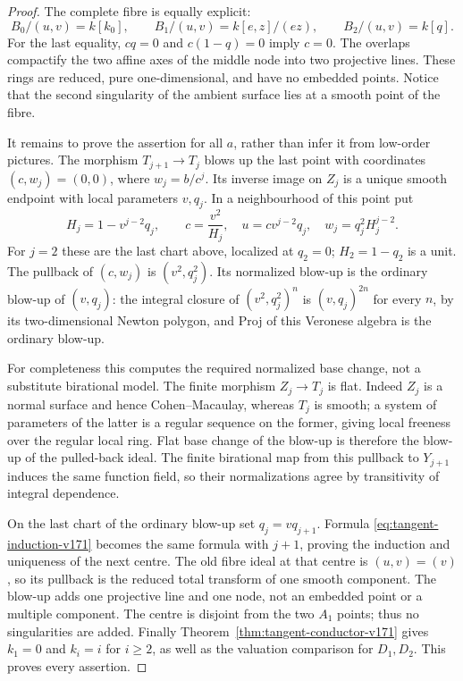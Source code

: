 \begin{proof}
The complete fibre is equally explicit:
\begin{equation}\label{eq:square-full-fibre-v171}
 B_0/(u,v)=k[k_0],\qquad
 B_1/(u,v)=k[e,z]/(ez),\qquad
 B_2/(u,v)=k[q].
\end{equation}
For the last equality, $cq=0$ and $c(1-q)=0$ imply $c=0$.
The overlaps compactify the two affine axes of the middle node into
two projective lines. These rings are reduced, pure one-dimensional,
and have no embedded points. Notice that the second singularity of
the ambient surface lies at a smooth point of the fibre.

It remains to prove the assertion for all $a$, rather than infer it
from low-order pictures. The morphism $T_{j+1}\to T_j$ blows up the
last point with coordinates $(c,w_j)=(0,0)$, where $w_j=b/c^j$.
Its inverse image on $Z_j$ is a unique smooth endpoint with local
parameters $v,q_j$. In a neighbourhood of this point put
\begin{equation}\label{eq:tangent-induction-v171}
 H_j=1-v^{j-2}q_j,\qquad
 c=\frac{v^2}{H_j},\quad
 u=c v^{j-2}q_j,\quad
 w_j=q_j^2H_j^{j-2}.
\end{equation}
For $j=2$ these are the last chart above, localized at $q_2=0$;
$H_2=1-q_2$ is a unit. The pullback of $(c,w_j)$ is
$(v^2,q_j^2)$. Its normalized blow-up is the ordinary blow-up of
$(v,q_j)$: the integral closure of $(v^2,q_j^2)^n$ is
$(v,q_j)^{2n}$ for every $n$, by its two-dimensional Newton polygon,
and Proj of this Veronese algebra is the ordinary blow-up.

For completeness this computes the required normalized base change,
not a substitute birational model. The finite morphism $Z_j\to T_j$
is flat. Indeed $Z_j$ is a normal surface and hence Cohen--Macaulay,
whereas $T_j$ is smooth; a system of parameters of the latter is a
regular sequence on the former, giving local freeness over the
regular local ring. Flat base change of the blow-up is therefore the
blow-up of the pulled-back ideal. The finite birational map from this
pullback to $Y_{j+1}$ induces the same function field, so their
normalizations agree by transitivity of integral dependence.

On the last chart of the ordinary blow-up set $q_j=vq_{j+1}$.
Formula \eqref{eq:tangent-induction-v171} becomes the same formula
with $j+1$, proving the induction and uniqueness of the next centre.
The old fibre ideal at that centre is $(u,v)=(v)$, so its pullback is
the reduced total transform of one smooth component. The blow-up adds
one projective line and one node, not an embedded point or a multiple
component. The centre is disjoint from the two $A_1$ points; thus
no singularities are added. Finally Theorem~\ref{thm:tangent-conductor-v171}
gives $k_1=0$ and $k_i=i$ for $i\geq2$, as well as the valuation
comparison for $D_1,D_2$. This proves every assertion.
\end{proof}

